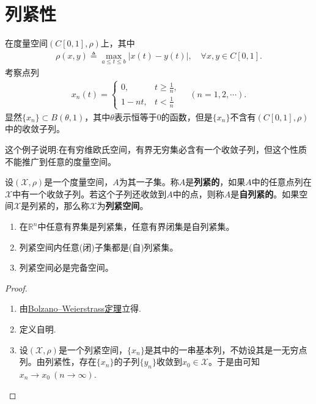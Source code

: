 \documentclass[../../main.tex]{subfiles}%
\begin{document}
\section{列紧性}

\begin{examples}
在度量空间$(C[0,1],\rho)$上，其中
\begin{align*}
\rho(x,y) \triangleq \max_{a \leqslant t \leqslant b} |x(t) - y(t)|,\quad \forall x,y\in C[0,1].
\end{align*}
考察点列
\begin{align*}
x_n(t)=
\begin{cases}
0, & t\geqslant\frac{1}{n}, \\
1-nt, & t<\frac{1}{n}
\end{cases}
\quad (n=1,2,\cdots).
\end{align*}
显然$\{x_n\}\subset B(\theta,1)$，其中$\theta$表示恒等于0的函数，但是$\{x_n\}$不含有$(C[0,1],\rho)$中的收敛子列。
\end{examples}
\begin{remark}
这个例子说明:在有穷维欧氏空间，有界无穷集必含有一个收敛子列，但这个性质不能推广到任意的度量空间。
\end{remark}

\begin{definition}
设$(\mathscr{X},\rho)$是一个度量空间，$A$为其一子集。称$A$是\textbf{列紧的}，如果$A$中的任意点列在$\mathscr{X}$中有一个收敛子列。若这个子列还收敛到$A$中的点，则称$A$是\textbf{自列紧的}。如果空间$\mathscr{X}$是列紧的，那么称$\mathscr{X}$为\textbf{列紧空间}。
\end{definition}

\begin{theorem}\label{theorem:列紧的基本性质}
\begin{enumerate}[(1)]
\item\label{theorem:列紧的基本性质-1} 在$\mathbb{R}^n$中任意有界集是列紧集，任意有界闭集是自列紧集。

\item\label{theorem:列紧的基本性质-2} 列紧空间内任意(闭)子集都是(自)列紧集。

\item\label{theorem:列紧的基本性质-3} 列紧空间必是完备空间。
\end{enumerate}
\end{theorem}
\begin{proof}
\begin{enumerate}[(1)]
\item 由\hyperref[Real Analysis-theorem:R^n中的Bolzano--Weierstrass定理]{Bolzano--Weierstrass定理}立得.

\item 定义自明.

\item 设$(\mathscr{X},\rho)$是一个列紧空间，$\{x_n\}$是其中的一串基本列，不妨设其是一无穷点列。由列紧性，存在$\{x_n\}$的子列$\{y_n\}$收敛到$x_0\in\mathscr{X}$。于是由可知$x_n\to x_0\ (n\to\infty)$.
\end{enumerate}
\end{proof}
\end{document}

